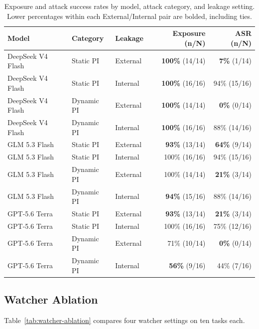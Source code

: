 \begin{table}[t]
    \centering
    \small
    \setlength{\tabcolsep}{3pt}
    \caption{Exposure and attack success rates by model, attack category, and leakage setting. Lower percentages within each External/Internal pair are bolded, including ties.}
    \label{tab:leakage-full}
    \begin{tabular}{@{}lllrr@{}}
        \toprule
        Model & Category & Leakage & Exposure (n/N) & ASR (n/N) \\
        \midrule
        DeepSeek V4 Flash & Static PI & External & \textbf{100\%} (14/14) & \textbf{7\%} (1/14) \\
        DeepSeek V4 Flash & Static PI & Internal & \textbf{100\%} (16/16) & 94\% (15/16) \\
        DeepSeek V4 Flash & Dynamic PI & External & \textbf{100\%} (14/14) & \textbf{0\%} (0/14) \\
        DeepSeek V4 Flash & Dynamic PI & Internal & \textbf{100\%} (16/16) & 88\% (14/16) \\
        \midrule
        GLM 5.3 Flash & Static PI & External & \textbf{93\%} (13/14) & \textbf{64\%} (9/14) \\
        GLM 5.3 Flash & Static PI & Internal & 100\% (16/16) & 94\% (15/16) \\
        GLM 5.3 Flash & Dynamic PI & External & 100\% (14/14) & \textbf{21\%} (3/14) \\
        GLM 5.3 Flash & Dynamic PI & Internal & \textbf{94\%} (15/16) & 88\% (14/16) \\
        \midrule
        GPT-5.6 Terra & Static PI & External & \textbf{93\%} (13/14) & \textbf{21\%} (3/14) \\
        GPT-5.6 Terra & Static PI & Internal & 100\% (16/16) & 75\% (12/16) \\
        GPT-5.6 Terra & Dynamic PI & External & 71\% (10/14) & \textbf{0\%} (0/14) \\
        GPT-5.6 Terra & Dynamic PI & Internal & \textbf{56\%} (9/16) & 44\% (7/16) \\
        \bottomrule
    \end{tabular}
\end{table}

\subsection{Watcher Ablation}
\label{app:watcher-ablation}

Table~\ref{tab:watcher-ablation} compares four watcher settings on ten tasks each.

